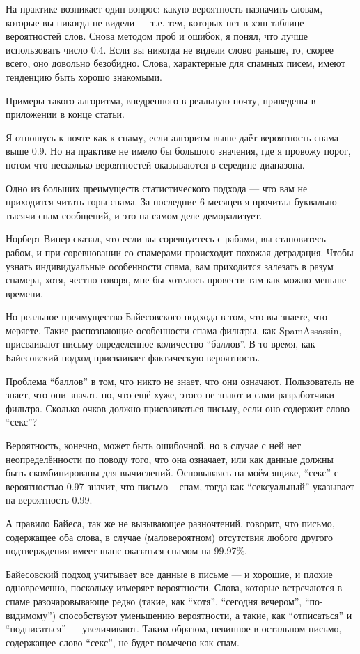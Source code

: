 \documentclass[ebook,12pt,oneside,openany]{memoir}
\begin{document}
На практике возникает один вопрос: какую вероятность назначить словам,
которые вы никогда не видели — т.е. тем, которых нет в хэш-таблице
вероятностей слов. Снова методом проб и ошибок, я понял, что лучше
использовать число 0.4. Если вы никогда не видели слово раньше, то,
скорее всего, оно довольно безобидно. Слова, характерные для спамных
писем, имеют тенденцию быть хорошо знакомыми.

Примеры такого алгоритма, внедренного в реальную почту, приведены в
приложении в конце статьи.

Я отношусь к почте как к спаму, если алгоритм выше даёт вероятность
спама выше 0.9. Но на практике не имело бы большого значения, где я
провожу порог, потом что несколько вероятностей оказываются в середине
диапазона.

Одно из больших преимуществ статистического подхода — что вам не
приходится читать горы спама. За последние 6 месяцев я прочитал
буквально тысячи спам-сообщений, и это на самом деле деморализует.

Норберт Винер сказал, что если вы соревнуетесь с рабами, вы
становитесь рабом, и при соревновании со спамерами происходит похожая
деградация. Чтобы узнать индивидуальные особенности спама, вам
приходится залезать в разум спамера, хотя, честно говоря, мне бы
хотелось провести там как можно меньше времени.

Но реальное преимущество Байесовского подхода в том, что вы знаете,
что меряете. Такие распознающие особенности спама фильтры, как
SpamAssassin, присваивают письму определенное количество “баллов”. В
то время, как Байесовский подход присваивает фактическую вероятность.

Проблема “баллов” в том, что никто не знает, что они означают.
Пользователь не знает, что они значат, но, что ещё хуже, этого не
знают и сами разработчики фильтра. Сколько очков должно присваиваться
письму, если оно содержит слово “секс”?

Вероятность, конечно, может быть ошибочной, но в случае с ней нет
неопределённости по поводу того, что она означает, или как данные
должны быть скомбинированы для вычислений. Основываясь на моём ящике,
“секс” с вероятностью 0.97 значит, что письмо – спам, тогда как
“сексуальный” указывает на вероятность 0.99.

А правило Байеса, так же не вызывающее разночтений, говорит, что
письмо, содержащее оба слова, в случае (маловероятном) отсутствия
любого другого подтверждения имеет шанс оказаться спамом на 99.97\%.

Байесовский подход учитывает все данные в письме — и хорошие, и плохие
одновременно, поскольку измеряет вероятности. Слова, которые
встречаются в спаме разочаровывающе редко (такие, как “хотя”, “сегодня
вечером”, “по-видимому”) способствуют уменьшению вероятности, а такие,
как “отписаться” и “подписаться” — увеличивают. Таким образом,
невинное в остальном письмо, содержащее слово “секс”, не будет
помечено как спам.
\end{document}
